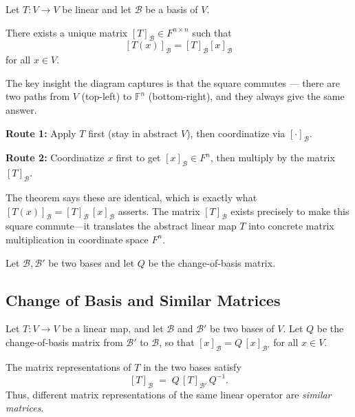 \documentclass[12pt]{article}
\theoremstyle{remark}
\theoremstyle{definition}
\begin{document}
Let $T: V \to V$ be linear and let $\mathcal{B}$ be a basis of $V$.

There exists a unique matrix $[T]_{\mathcal{B}} \in F^{n \times n}$ such that
\[
[T(x)]_{\mathcal{B}} = [T]_{\mathcal{B}} [x]_{\mathcal{B}}
\]
for all $x \in V$.

\begin{center}
\end{center}

The key insight the diagram captures is that the square commutes — there are two paths from $V$ (top-left) to $\mathbb{F}^n$ (bottom-right), and they always give the same answer. 

\textbf{Route 1:} Apply $T$ first (stay in abstract $V$), then coordinatize via $[\cdot]_{\mathcal{B}}$.

\textbf{Route 2:} Coordinatize $x$ first to get $[x]_{\mathcal{B}} \in F^n$, then multiply by the matrix $[T]_{\mathcal{B}}$.

The theorem says these are identical, which is exactly what $    [T(x)]_{\mathcal{B}} = [T]_{\mathcal{B}}\, [x]_{\mathcal{B}}$ asserts. The matrix $[T]_{\mathcal{B}}$ exists precisely to make this square commute---it translates the abstract linear map $T$ into concrete matrix multiplication in coordinate space $F^n$.

Let $\mathcal{B}, \mathcal{B}'$ be two bases and let $Q$ be the change-of-basis matrix.


\subsection*{Change of Basis and Similar Matrices}

Let $T : V \to V$ be a linear map, and let $\mathcal{B}$ and $\mathcal{B}'$ be two bases of $V$.
Let $Q$ be the change-of-basis matrix from $\mathcal{B}'$ to $\mathcal{B}$, so that
$[x]_{\mathcal{B}} = Q\,[x]_{\mathcal{B}'}$ for all $x \in V$.

\medskip
The matrix representations of $T$ in the two bases satisfy
\[
    [T]_{\mathcal{B}} \;=\; Q\,[T]_{\mathcal{B}'}\,Q^{-1}.
\]
Thus, different matrix representations of the same linear operator are \emph{similar matrices}.
\end{document}
